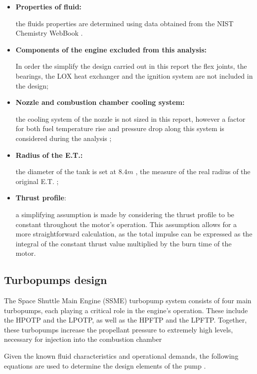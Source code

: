 \begin{itemize}
\item\textbf{Properties of fluid:}

the fluids properties are determined using data obtained from the NIST Chemistry WebBook \cite{nist}.
    \item\textbf{Components of the engine excluded from this analysis:}

    In order the simplify the design carried out in this report the flex joints, the bearings, the LOX heat exchanger and the ignition system are not included in the design;

    \item\textbf{Nozzle and combustion chamber cooling system:}

    the cooling system of the nozzle is not sized in this report, however a factor for both fuel temperature rise and pressure drop along this system is considered during the analysis ;
    \item\textbf{Radius of the E.T.:}

    the diameter of the tank is set at $8.4 m$ , the measure of the real radius of the original E.T. ;
    
\item\textbf{Thrust profile}:

    a simplifying assumption is made by considering the thrust profile to be constant throughout the motor's operation.
    This assumption allows for a more straightforward calculation, as the total impulse can be expressed as the integral of the constant thrust value multiplied by the burn time of the motor.


\end{itemize}

\subsection{Turbopumps design}
The Space Shuttle Main Engine (SSME) turbopump system consists of four main turbopumps, each playing a critical role in the engine's operation. These include the \acrfull{HPOTP} and the \acrfull{LPOTP}, as well as the \acrfull{HPFTP} and the \acrfull{LPFTP}. Together, these turbopumps increase the propellant pressure to extremely high levels, necessary for injection into the combustion chamber

Given the known fluid characteristics and operational demands, the following equations are used to determine the design elements of the pump \cite{humble95}.

